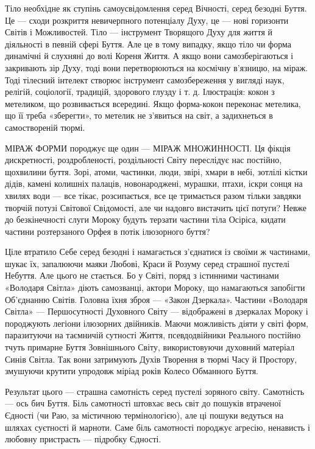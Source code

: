 Тіло необхідне як ступінь самоусвідомлення серед Вічності, серед безодні Буття.
Це — сходи розкриття невичерпного потенціалу Духу, це — нові горизонти Світів і
Можливостей. Тіло — інструмент Творящого Духу для життя й діяльності в певній
сфері Буття. Але це в тому випадку, якщо тіло чи форма динамічні й слухняні до
волі Кореня Життя. А якщо вони самозберігаються і закривають зір Духу, тоді
вони перетворюються на космічну в’язницю, на міраж. Тоді тілесний інтелект
створює інструмент самозбереження у вигляді наук, релігій, соціології,
традицій, здорового глузду і т. д. Ілюстрація: кокон з метеликом, що
розвивається всередині. Якщо форма-кокон переконає метелика, що її треба
«зберегти», то метелик не з’явиться на світ, а задихнеться в самоствореній
тюрмі.

МІРАЖ ФОРМИ породжує ще один — МІРАЖ МНОЖИННОСТІ. Ця фікція дискретності,
роздробленості, роздільності Світу переслідує нас постійно, щохвилини буття.
Зорі, атоми, частинки, люди, звірі, хмари в небі, зотлілі кістки дідів, камені
колишніх палаців, новонароджені, мурашки, птахи, іскри сонця на хвилях води —
все тікає, розсипається, все це тримається разом тільки завдяки творчій потузі
Світової Свідомості, але чи надовго вистачить цієї потуги? Невже до
безкінечності слуги Мороку будуть терзати частини тіла Осіріса, кидати частини
розтерзаного Орфея в потік ілюзорного буття?

Ціле втратило Себе серед безодні і намагається з’єднатися із своїми ж
частинами, шукає їх, запалюючи маяки Любові, Краси й Розуму серед страшної
пустелі Небуття. Але цього не стається. Бо у Світі, поряд з істинними частинами
«Володаря Світла» діють самозванці, актори Мороку, що намагаються запобігти
Об’єднанню Світів. Головна їхня зброя — «Закон Дзеркала». Частини «Володаря
Світла» — Першосутності Духовного Світу — відображені в дзеркалах Мороку і
породжують легіони ілюзорних двійників. Маючи можливість діяти у світі форм,
паразитуючи на таємничій сутності Життя, псевдодвійники Реального постійно
тчуть примарне Буття Зовнішнього Світу, використовуючи духовний матеріал Синів
Світла. Так вони затримують Духів Творення в тюрмі Часу й Простору, змушуючи
крутити упродовж міріад років Колесо Обманного Буття.

Результат цього — страшна самотність серед пустелі зоряного світу. Самотність —
ось бич Буття. Біль самотності штовхає весь світ до пошуків втраченої Єдності
(чи Раю, за містичною термінологією), але ці пошуки ведуться на шляхах
суєтності й марноти. Саме біль самотності породжує агресію, ненависть і любовну
пристрасть — підробку Єдності.

